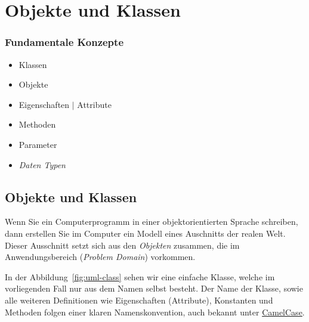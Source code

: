 \section{Objekte und Klassen}
\label{sec:contents}

\begin{frame}[fragile]
    \frametitle<presentation>{Fundamentale Konzepte}

    \begin{itemize}
        \item Klassen
        \item Objekte
        \item Eigenschaften $|$ Attribute
        \item Methoden
        \item Parameter
        \item \emph{Daten Typen}
    \end{itemize}
\end{frame}


\subsection{Objekte und Klassen}
\label{subsec:objects-classes}

Wenn Sie ein Computerprogramm in einer objektorientierten Sprache schreiben,
dann erstellen Sie im Computer ein Modell eines Auschnitts der realen Welt.
Dieser Ausschnitt setzt sich aus den \emph{Objekten} zusammen, die im
Anwendungsbereich (\emph{Problem Domain}) vorkommen.


In der Abbildung~\ref{fig:uml-class} sehen wir eine einfache Klasse,
welche im vorliegenden Fall nur aus dem Namen selbst besteht. Der Name der Klasse,
sowie alle weiteren Definitionen wie Eigenschaften (Attribute), Konstanten und Methoden
folgen einer klaren Namenskonvention, auch bekannt unter
\href{https://www.geeksforgeeks.org/java-naming-conventions/}{CamelCase}.

